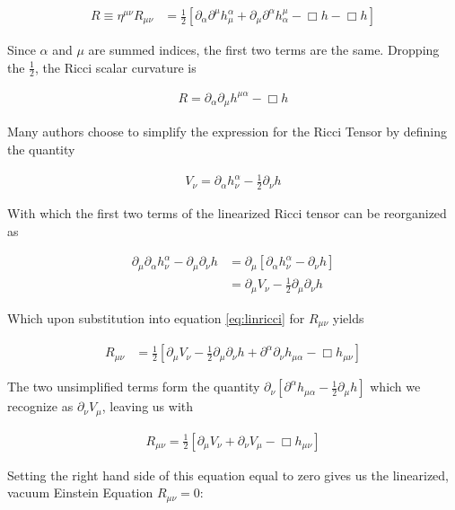 \begin{align}
R \equiv \eta^{\mu \nu}R_{\mu \nu} &= \frac{1}{2}\left[\partial_{\alpha}\partial^{\mu}h_{\mu}^{\alpha} + \partial_{\mu} \partial^{\alpha}h^{\mu}_{\alpha} - \Box h - \Box h\right]
\end{align}

Since $\alpha$ and $\mu$ are summed indices, the first two terms are the same. Dropping the $\frac{1}{2}$, the Ricci scalar curvature is 

\begin{align}
R = \partial_{\alpha}\partial_{\mu}h^{\mu \alpha} - \Box h
\end{align}

Many authors choose to simplify the expression for the Ricci Tensor by defining the quantity

\begin{align}\label{eq:lorentzgauge}
V_{\nu} = \partial_{\alpha}h^{\alpha}_{\nu} - \frac{1}{2}\partial_{\nu}h
\end{align}

With which the first two terms of the linearized Ricci tensor can be reorganized as

\begin{align}
\partial_{\mu}\partial_{\alpha}h_{\nu}^{\alpha} - \partial_{\mu}\partial_{\nu}h &= \partial_{\mu}\left[\partial_{\alpha}h_{\nu}^{\alpha} - \partial_{\nu}h\right] \\
&= \partial_{\mu}V_{\nu} - \frac{1}{2}\partial_{\mu}\partial_{\nu}h
\end{align}

Which upon substitution into equation \ref{eq:linricci} for $R_{\mu \nu}$ yields

\begin{align}
R_{\mu \nu} &= \frac{1}{2}\left[\partial_{\mu}V_{\nu} - \frac{1}{2}\partial_{\mu}\partial_{\nu}h + \partial^{\alpha}\partial_{\nu}h_{\mu \alpha} - \Box h_{\mu \nu}\right]
\end{align}

The two unsimplified terms form the quantity $\partial_{\nu}\left[\partial^{\alpha}h_{\mu \alpha} - \frac{1}{2}\partial_{\mu}h\right]$ which we recognize as $\partial_{\nu}V_{\mu}$, leaving us with

\begin{align}
R_{\mu \nu} = \frac{1}{2}\left[\partial_{\mu}V_{\nu} + \partial_{\nu}V_{\mu} - \Box h_{\mu \nu}\right] 
\end{align}

Setting the right hand side of this equation equal to zero gives us the linearized, vacuum Einstein Equation $R_{\mu \nu} = 0$:

